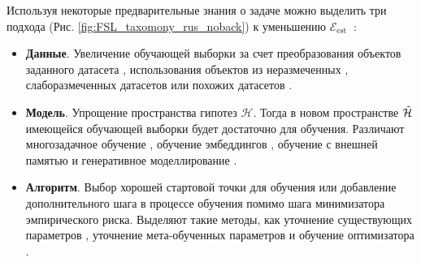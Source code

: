 \newpage

Используя некоторые предварительные знания о задаче можно выделить три подхода (Рис. \ref{fig:FSL_taxomony_rus_noback}) к уменьшению $\mathcal{E}_{\text {est }}$ \cite{FSLsurvey}: 
\begin{itemize}
    \item \textbf{Данные}. Увеличение обучающей выборки за счет преобразования объектов заданного датасета \cite{ReviewShareddensities, ReviewDeltaEncoder, ReviewLowShotVisual, ReviewOneShotSceneLocations, ReviewFeatureSpaceTransfer}, использования объектов из неразмеченных \cite{Review, ReviewLowShotDiffusion, ReviewStepwiseLearning}, слаборазмеченных датасетов или похожих датасетов \cite{ReviewStepwiseLearning, ReviewGenerativeAdversalNets, ReviewLowShotAugmentationNets}.
    \item \textbf{Модель}. Упрощение пространства гипотез $\mathcal{H}$. Тогда в новом пространстве $\Tilde{\mathcal{H}}$ имеющейся обучающей выборки будет достаточно для обучения. Различают многозадачное обучение \cite{ReviewMultitaskLearning, ReviewSurveyMultiTask, ReviewDeepLearning}, обучение эмбеддингов \cite{ReviewConvolutionArchitectureEmbedding, ReviewDifferentialGeometry}, обучение с внешней памятью \cite{ReviewNeuralTuringMachines, ReviewKeyValueMemory, ReviewEndToEndMemory,  ReviewMemoryNetworks}  и генеративное моделлирование \cite{ReviewNeuralStatistician, ReviewConceptLearning, ReviewFewShotAutoregressive, ReviewOneShotGeneralization}.
    \item \textbf{Алгоритм}. Выбор хорошей стартовой точки для обучения или добавление дополнительного шага в процессе обучения помимо шага минимизатора эмпирического риска. Выделяют такие методы, как уточнение существующих параметров \cite{ReviewOneShotVideoSegmentation}, уточнение мета-обученных параметров \cite{ReviewMetaLearningFastAdaptation} и обучение оптимизатора \cite{ReviewGradientDescendDouble, ReviewOptimizationModelFewShot}.
\end{itemize}

